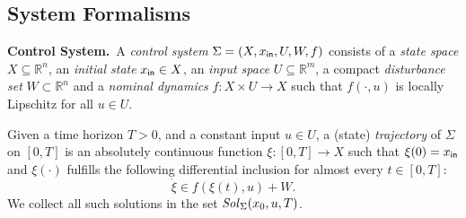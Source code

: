 

\subsection{System Formalisms}
 
\smallskip
\noindent\textbf{Control System.}\
A \emph{control system} $\Sigma = (X, x_{\mathsf{in}}, U, W, f)$
consists of a \emph{state space} $X\subseteq \mathbb{R}^n$,
an \emph{initial state} $x_{\mathsf{in}}\in X$,
 an \emph{input space} $U\subseteq\mathbb{R}^m$, 
a compact \emph{disturbance set} $W\subset \mathbb{R}^n$ and
a \emph{nominal dynamics} $f:X\times U\rightarrow X$ such that $f(\cdot,u)$ is locally Lipschitz for all $u\in U$.%
%

Given a time horizon $T>0$, and a constant input $u\in U$, 
a (state) \emph{trajectory} of $\Sigma$ 
on $[0,T]$ is an absolutely continuous function $\xi:[0,T]\rightarrow X$  such that $\xi(0) = x_{\mathsf{in}}$ and
$\xi(\cdot)$ fulfills the following differential inclusion for almost every $t\in[0,T]$:
\begin{equation}\label{equ:def_f}
 \dot{\xi}\in f(\xi(t),u) + W. 
\end{equation} 
We collect all such solutions in the set $\mathit{Sol}_\Sigma(x_0,u,T)$. 

